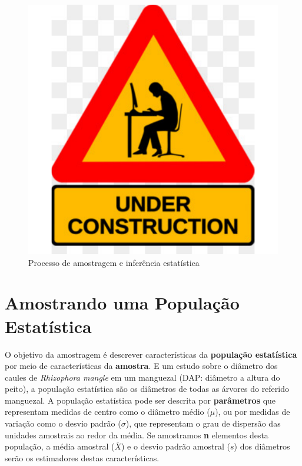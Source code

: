 \documentclass[
]{book}
\begin{document}
\begin{figure}

{\centering \includegraphics[width=18in]{probest-cambientais_files/figure-latex/unnamed-chunk-238-1} 

}

\caption{Processo de amostragem e inferência estatística}\label{fig:unnamed-chunk-238}
\end{figure}

\hypertarget{amostrmedias}{%
\chapter{Amostrando uma População Estatística}\label{amostrmedias}}

O objetivo da amostragem é descrever características da \textbf{população estatística} por meio de características da \textbf{amostra}. E um estudo sobre o diâmetro dos caules de \emph{Rhizophora mangle} em um manguezal (DAP: diâmetro a altura do peito), a população estatística são os diâmetros de todas as árvores do referido manguezal. A população estatística pode ser descrita por \textbf{parâmetros} que representam medidas de centro como o diâmetro médio (\(\mu\)), ou por medidas de variação como o desvio padrão (\(\sigma\)), que representam o grau de dispersão das unidades amostrais ao redor da média. Se amostramos \textbf{n} elementos desta população, a média amostral (\(\overline{X}\)) e o desvio padrão amostral (\(s\)) dos diâmetros serão os estimadores destas características.
\end{document}
